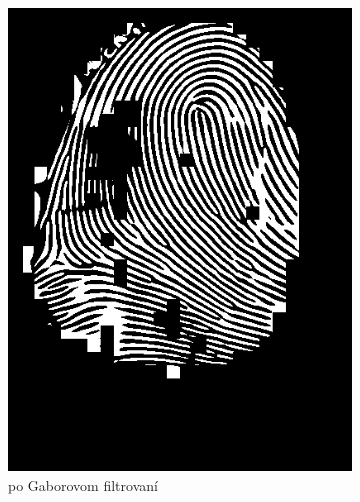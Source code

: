 \begin{figure}[h]
\begin{subfigure}[b]{0.3\linewidth}
      \includegraphics[width=\linewidth]{obrazky-figures/ecsema_gabor.png}
      \caption{po Gaborovom filtrovaní}
      \label{obr:ecsema_gabor}
    \end{subfigure}
    \hfill
    \begin{subfigure}[b]{0.3\linewidth}

\end{subfigure}
\end{figure}
